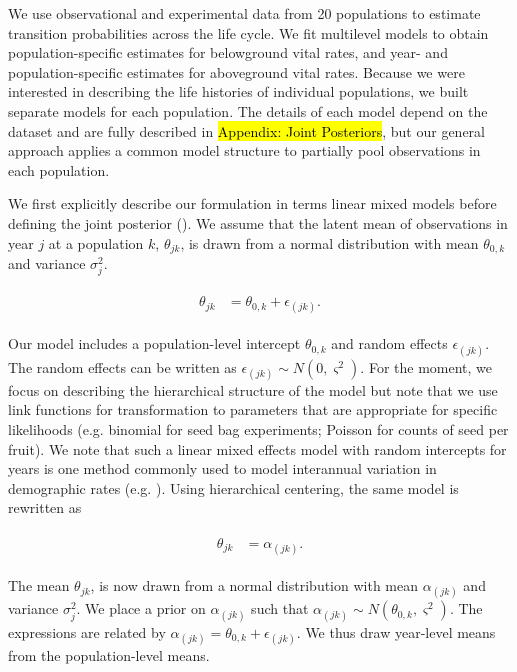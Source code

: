\documentclass[12pt, oneside]{article}   	%
\begin{document}
We use observational and experimental data from 20 populations to estimate transition probabilities across the life cycle. We fit multilevel models to obtain population-specific estimates for belowground vital rates, and year- and population-specific estimates for aboveground vital rates. Because we were interested in describing the life histories of individual populations, we built separate models for each population. The details of each model depend on the dataset and are fully described in \hl{Appendix: Joint Posteriors}, but our general approach applies a common model structure to partially pool observations in each population. 

We first explicitly describe our formulation in terms linear mixed models before defining the joint posterior (\cite{evans2010,ogle2020}). We assume that the latent mean of observations in year $j$ at a population $k$, $\theta_{jk}$, is drawn from a normal distribution with mean $\theta_{0,k}$ and variance $\sigma^2_j$.

\begin{align}
  \begin{split}
  \theta_{jk} &  = \theta_{0,k} +\epsilon_{(jk)}.
  \end{split}
\end{align}

Our model includes a population-level intercept $\theta_{0,k}$ and random effects $\epsilon_{(jk)}$. The random effects can be written as  $\epsilon_{(jk)}\sim N(0, \varsigma^2)$. For the moment, we focus on describing the hierarchical structure of the model but note that we use link functions for transformation to parameters that are appropriate for specific likelihoods (e.g. binomial for seed bag experiments; Poisson for counts of seed per fruit). We note that such a linear mixed effects model with random intercepts for years is one method commonly used to model interannual variation in demographic rates (e.g. \cite{metcalf2015}). Using hierarchical centering, the same model is rewritten as 

\begin{align}
  \begin{split}
  \theta_{jk} &  = \alpha_{(jk)}.
  \end{split}
\end{align}

The mean $\theta_{jk}$, is now drawn from a normal distribution with mean $\alpha_{(jk)}$ and variance $\sigma^2_j$. We place a prior on $\alpha_{(jk)}$ such that $\alpha_{(jk)}\sim N(\theta_{0,k}, \varsigma^2)$. The expressions are related by $\alpha_{(jk)}=\theta_{0,k}+\epsilon_{(jk)}$. We thus draw year-level means from the population-level means. 
\end{document}
